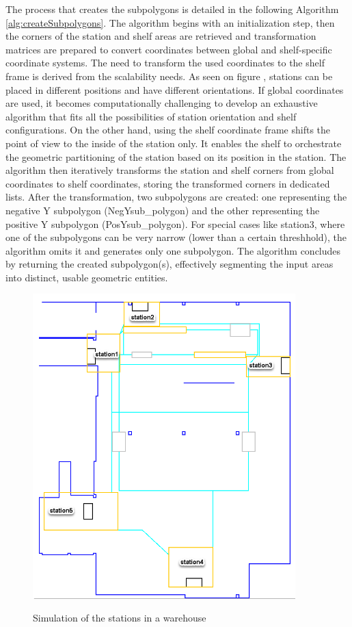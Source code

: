 The process that creates the subpolygons is detailed in the following Algorithm \ref{alg:createSubpolygons}.
The algorithm begins with an initialization step, then the corners of the station and shelf areas are retrieved and 
transformation matrices are prepared to convert coordinates between global and shelf-specific coordinate systems. 
The need to transform the used coordinates to the shelf frame is derived from the scalability needs.
As seen on figure , stations can be placed in different positions and have different orientations.
If global coordinates are used, it becomes computationally challenging to develop an exhaustive algorithm that fits all the 
possibilities of station orientation and shelf configurations. On the other hand, using the shelf coordinate frame shifts 
the point of view to the inside of the station only. It enables the shelf to orchestrate the geometric partitioning 
of the station based on its position in the station.
The algorithm then iteratively transforms the station and shelf corners from global coordinates to shelf coordinates, 
storing the transformed corners in dedicated lists. After the transformation, two subpolygons are created: one 
representing the negative Y subpolygon (NegYsub\_polygon) and the other representing the positive Y subpolygon
(PosYsub\_polygon). For special cases like station3, where one of the subpolygons can be very narrow (lower than a 
certain threshhold), the algorithm omits it and generates only one subpolygon. 
The algorithm concludes by returning the created subpolygon(s), effectively segmenting the 
input areas into distinct, usable geometric entities.


\begin{figure}[H]
    \begin{center}
        \includegraphics[width=4in]{images/Chap2/warehouse.png}\\
        \caption{Simulation of the stations in a warehouse}
        \label{warehouse}
        \end{center}    
\end{figure}



